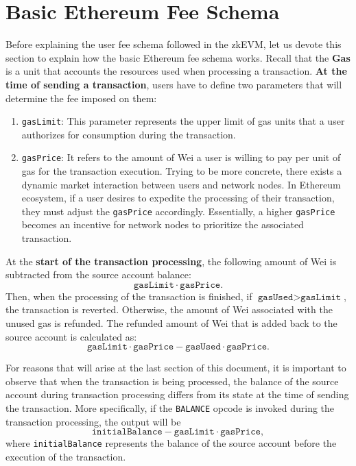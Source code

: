


\section{Basic Ethereum Fee Schema}

Before explaining the user fee schema followed in the zkEVM, let us devote this section to explain how the basic Ethereum fee schema works. Recall that the \textbf{Gas} is a unit that accounts the resources used when processing a transaction. \textbf{At the time of sending a transaction}, users have to define two parameters that will determine the fee imposed on them:

\begin{enumerate}
\item \texttt{gasLimit}: This parameter represents the upper limit of gas units that a user authorizes for consumption during the transaction.

\item \texttt{gasPrice}: It refers to the amount of Wei a user is willing to pay per unit of gas for the transaction execution. Trying to be more concrete, there exists a dynamic market interaction between users and network nodes. In Ethereum ecosystem, if a user desires to expedite the processing of their transaction, they must adjust the \texttt{gasPrice} accordingly. Essentially, a higher \texttt{gasPrice} becomes an incentive for network nodes to prioritize the associated transaction.

\end{enumerate}

At the \textbf{start of the transaction processing}, the following
amount of Wei is subtracted from the source account balance:
\[
\texttt{gasLimit} \cdot \texttt{gasPrice}.
\]
Then, when the processing of the transaction is finished, if $\texttt{gasUsed} > \texttt{gasLimit}$, the transaction is reverted. Otherwise, the amount of Wei associated with the unused gas is refunded. The refunded amount of Wei that is added back to the source account is calculated as:
\[
\texttt{gasLimit} \cdot \texttt{gasPrice} - \texttt{gasUsed} \cdot \texttt{gasPrice}.
\]

For reasons that will arise at the last section of this document, it is important to observe that when the transaction is being processed, the balance of the source account during transaction processing differs from its state at the time of sending the transaction. More specifically, if the \texttt{BALANCE} opcode is invoked during the transaction processing, the output will be
\[
\texttt{initialBalance} - \texttt{gasLimit} \cdot \texttt{gasPrice},
\]
where \texttt{initialBalance} represents the balance of the source account before the execution of the transaction.







